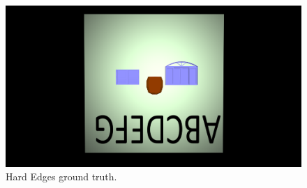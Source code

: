 \documentclass{cslthse-msc}
\begin{document}
\begin{figure}[H]
	\centering
	\includegraphics[scale=0.09]{images/results/hard_test_sobel_ground_truth.png}
	\caption{Hard Edges ground truth.}\label{fig:hard_test_truth}
\end{figure}
\end{document}
